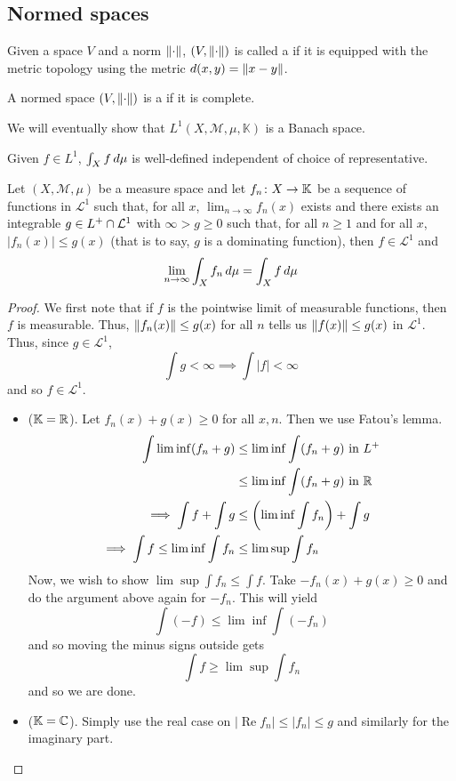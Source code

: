 \documentclass[11pt,leqno,oneside]{amsbook}
\numberwithin{thm}{section}
\newcommand{\M}{\mathcal{M}}
\newcommand{\cL}{\mathcal{L}}
\newcommand{\K}{\mathbb{K}} %
\begin{document}
\subsection{Normed spaces}
\begin{defn}
  Given a space \(V\) and a norm \(\norm\),  \((V,\norm)\) is called a
   if it is equipped with the metric topology using
  the metric \(d(x,y) = \norm[x-y]\).
\end{defn}
\begin{defn}
  A normed space \((V,\norm)\) is a  if it is
  complete.
\end{defn}
We will eventually show that \(L^1(X,\M,\mu,\mathbb{K})\) is a Banach
space.
\begin{rmk}
  Given \(f \in L^1\), \(\int_X f \d\mu\) is well-defined independent
  of choice of representative.
\end{rmk}
\begin{thm}\label{dct-v1}
  Let \((X,\M,\mu)\) be a measure space and let \(f_n \from X \to
  \mathbb{K}\) be a sequence of functions in \(\cL^1\) such that, for
  all \(x\), \(\lim_{n \to \infty} f_n(x)\) exists and there exists an
  integrable \(g \in L^+ \intersect \cL^1\) with \(\infty > g \geq
  0\) such that, for all \(n \geq 1\) and for all \(x\), \(|f_n(x)|
  \leq g(x)\) (that is to say, \(g\) is a dominating function), then
  \(f \in \cL^1\) and \[
    \lim_{n \to \infty} \int_X f_n \d\mu = \int_X f \d\mu
  \]
\end{thm}
\begin{proof}
  We first note that if \(f\) is the pointwise limit of measurable
  functions, then \(f\) is measurable. Thus, \(\norm[f_n(x)] \leq
  g(x)\) for all \(n\) tells us \(\norm[f(x)] \leq g(x)\) in
  \(\cL^1\). Thus, since \(g \in \cL^1\), \[
    \int g < \infty \implies \int |f| < \infty
  \]
  and so \(f \in \cL^1\).
  \begin{itemize}
  \item (\(\K = \R\)). Let \(f_n(x) + g(x) \geq 0\) for all
    \(x,n\). Then we use Fatou's lemma.
    \begin{align*}
      \int \lim \inf (f_n+g)
      & \leq \lim \inf \int (f_n+g) \text{ in }L^+ \\
      & \leq \lim \inf \int (f_n+g) \text{ in }\R \\
      \implies \int f + \int g & \leq \left( \lim \inf \int f_n \right)
      + \int g \\
      \implies \int f \leq \lim \inf \int f_n & \leq \lim \sup \int f_n
    \end{align*}
    Now, we wish to show \(\lim \sup \int f_n \leq \int f\). Take
    \(-f_n(x) + g(x) \geq 0\) and do the argument above again for
    \(-f_n\). This will yield \[
      \int (-f) \leq \lim \inf \int (-f_n)
    \]
    and so moving the minus signs outside gets \[
      \int f \geq \lim \sup \int f_n
    \]
    and so we are done.
  \item (\(\K = \C\)). Simply use the real case on \(|\operatorname{Re}
   f_n| \leq |f_n| \leq g\) and similarly for the imaginary part.
  \end{itemize}
\end{proof}
\end{document}
